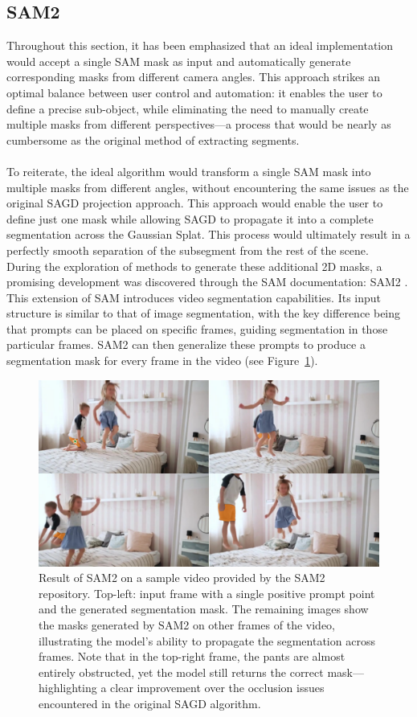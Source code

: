 \documentclass[12pt]{article}
\begin{document}
\subsection{SAM2}
Throughout this section, it has been emphasized that an ideal implementation would accept a single SAM mask as input and automatically generate corresponding masks from different camera angles. This approach strikes an optimal balance between user control and automation: it enables the user to define a precise sub-object, while eliminating the need to manually create multiple masks from different perspectives—a process that would be nearly as cumbersome as the original method of extracting segments.
\\\\
To reiterate, the ideal algorithm would transform a single SAM mask into multiple masks from different angles, without encountering the same issues as the original SAGD projection approach. This approach would enable the user to define just one mask while allowing SAGD to propagate it into a complete segmentation across the Gaussian Splat. This process would ultimately result in a perfectly smooth separation of the subsegment from the rest of the scene.\\
During the exploration of methods to generate these additional 2D masks, a promising development was discovered through the SAM documentation: SAM2 \parencite{SAM2}. This extension of SAM introduces video segmentation capabilities. Its input structure is similar to that of image segmentation, with the key difference being that prompts can be placed on specific frames, guiding segmentation in those particular frames. SAM2 can then generalize these prompts to produce a segmentation mask for every frame in the video (see Figure~\ref{fig:children}).
\begin{figure}[h!]
	\centering
	\includegraphics[width=\textwidth]{Images/children.png}
	\caption{Result of SAM2 on a sample video provided by the SAM2 repository. Top-left: input frame with a single positive prompt point and the generated segmentation mask. The remaining images show the masks generated by SAM2 on other frames of the video, illustrating the model's ability to propagate the segmentation across frames. Note that in the top-right frame, the pants are almost entirely obstructed, yet the model still returns the correct mask—highlighting a clear improvement over the occlusion issues encountered in the original SAGD algorithm.}
	\label{fig:children}
\end{figure}
\end{document}
